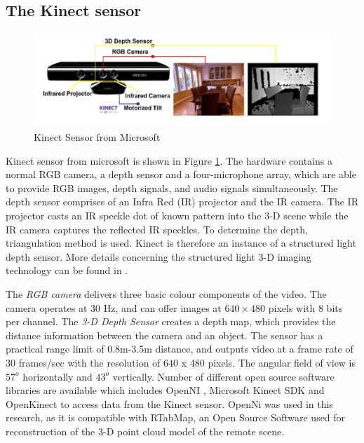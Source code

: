 \subsection{The Kinect sensor }
\begin{figure}
	\includegraphics[width=\linewidth,keepaspectratio]{Chapter7/fig/Kinect}
	\caption{Kinect Sensor from Microsoft}	\label{fig:Kinect}
\end{figure}
Kinect sensor from microsoft is shown in Figure \ref{fig:Kinect}. The hardware contains a normal RGB camera, a depth sensor and a four-microphone array, which are able to provide  RGB images,  depth signals, and audio signals simultaneously. The depth sensor comprises of an Infra Red (IR) projector and the IR camera. The IR projector casts an IR speckle dot of known  pattern into the 3-D scene while the IR camera captures the reflected IR speckles. To determine the depth, triangulation method is used.  Kinect is therefore an instance of a structured light depth sensor. More details concerning the structured light 3-D imaging technology can be found in \cite{geng2011structured}. 

The \textit{RGB camera}  delivers three basic colour components of the video. The camera operates at 30 Hz, and can offer images at $640\times480$ pixels with 8 bits per channel. The  \textit{3-D Depth Sensor} creates a depth map, which provides the distance information between the camera and an object. The sensor has a practical range limit of 0.8m-3.5m distance, and outputs video at a frame rate of 30 frames/sec with the resolution of 640 x 480 pixels. The angular field of view is $57^o$ horizontally and $43^o$ vertically.
Number of different open source software libraries are available  which includes OpenNI \cite{openni}, Microsoft Kinect SDK  \cite{mssdk} and OpenKinect \cite{freenect} to access data from the Kinect sensor. OpenNi was used in this research, as it is compatible with RTabMap, an Open Source Software used for reconstruction of the 3-D point cloud model of the  remote scene. 

